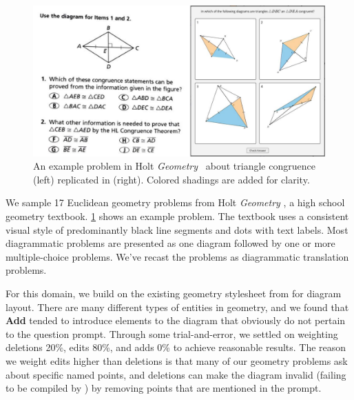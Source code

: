 \begin{figure}[h!]
    \centering
    \includegraphics[width=\linewidth]{assets/edgeworth/geometry-problem.pdf}
    \caption{An example problem in Holt \textit{Geometry}~\cite{holtGeometry} about triangle congruence (left) replicated in \Edgeworth (right). Colored shadings are added for clarity.}
    \label{fig:geometry-problem}
\end{figure}

We sample 17 Euclidean geometry problems from Holt \textit{Geometry} \cite{holtGeometry}, a high school geometry textbook. \cref{fig:geometry-problem} shows an example problem. The textbook uses a consistent visual style of predominantly black line segments and dots with text labels. Most diagrammatic problems are presented as one diagram followed by one or more multiple-choice problems. We've recast the problems as diagrammatic translation problems.

For this domain, we build on the existing geometry stylesheet from \Penrose \cite[Section~5.3]{penrose} for diagram layout. There are many different types of entities in geometry, and we found that \textbf{Add} tended to introduce elements to the diagram that obviously do not pertain to the question prompt.
Through some trial-and-error, we settled on weighting deletions 20\%, edits 80\%, and adds 0\% to achieve reasonable results. The reason we weight edits higher than deletions is that many of our geometry problems ask about specific named points, and deletions can make the diagram invalid (\ie \Substance failing to be compiled by \Penrose) by removing points that are mentioned in the prompt.


